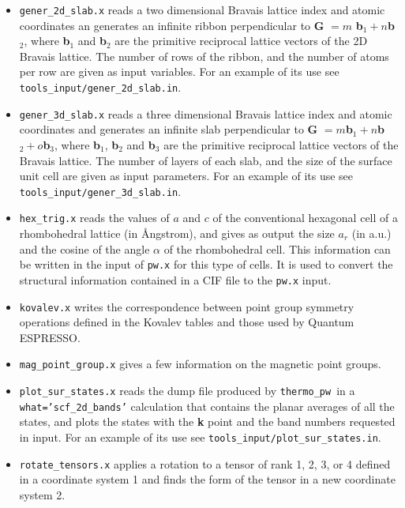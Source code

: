 \documentclass[12pt,a4paper]{article}
\def\qe{{\sc Quantum ESPRESSO}}
\def\thermo{\texttt{thermo\_pw}}
\begin{document}
\begin{itemize}
\item \texttt{gener\_2d\_slab.x} reads a two dimensional 
Bravais lattice index and atomic coordinates an generates an infinite ribbon
perpendicular to {\bf G} $= m$ {\bf b}$_1 + n ${\bf b}$_2$, where 
{\bf b}$_1$ and {\bf b}$_2$ are the primitive reciprocal lattice vectors 
of the 2D Bravais lattice. The number of rows of the ribbon, and the number of
atoms per row are given as input variables.
For an example of its use see \texttt{tools\_input/gener\_2d\_slab.in}.

\item \texttt{gener\_3d\_slab.x} reads a three dimensional
Bravais lattice index and atomic coordinates and generates an infinite slab
perpendicular to {\bf G} $= m ${\bf b}$_1 + n ${\bf b}$_2 + o ${\bf b}$_3$, 
where {\bf b}$_1$, {\bf b}$_2$ and {\bf b}$_3$ are the primitive reciprocal 
lattice
vectors of the Bravais lattice. The number of layers of each slab, and the
size of the surface unit cell are given as input parameters.
For an example of its use see \texttt{tools\_input/gener\_3d\_slab.in}.

\item \texttt{hex\_trig.x} reads the values of $a$ and $c$
of the conventional hexagonal cell of a rhombohedral lattice (in \AA ngstrom),
and gives as output the size $a_r$ (in a.u.) and the cosine of the angle
$\alpha$ of the rhombohedral cell. This information can
be written in the input of \texttt{pw.x} for this type of cells. It
is used to convert the structural information contained in a CIF file
to the \texttt{pw.x} input.

\item \texttt{kovalev.x} writes the correspondence between point group
symmetry operations defined in the Kovalev tables and those used by \qe.

\item \texttt{mag\_point\_group.x} gives a few information on the magnetic point
groups.

\item \texttt{plot\_sur\_states.x} reads the dump file produced
by \thermo\ in a \texttt{what='scf\_2d\_bands'} calculation that
contains the planar averages of all the states, and plots
the states with the {\bf k} point and the band numbers requested in input.
For an example of its use see \texttt{tools\_input/plot\_sur\_states.in}.

\item \texttt{rotate\_tensors.x} applies a rotation to a tensor
of rank 1, 2, 3, or 4 defined in a coordinate system 1 and finds the form
of the tensor in a new coordinate system 2. 


\end{itemize}
\end{document}

